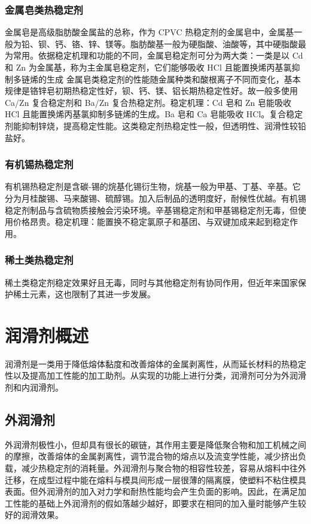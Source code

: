 \subsubsection{金属皂类热稳定剂}
金属皂是高级脂肪酸金属盐的总称，作为 CPVC 热稳定剂的金属皂中，金属基一般为铅、钡、钙、铬、锌、镁等。脂肪酸基一般为硬脂酸、油酸等，其中硬脂酸最为常用。依据稳定机理和功能的不同，金属皂稳定剂可分为两大类：一类是以 Cd 和 Zn 为金属基，称为主金属皂稳定剂，它们能够吸收 HCl 且能置换烯丙基氯抑制多链烯的生成
金属皂类稳定剂的性能随金属种类和酸根离子不同而变化，基本规律是铬锌皂初期热稳定性好，钡、钙、镁、铝长期热稳定性好。故一般多使用 Ca/Zn 复合稳定剂和 Ba/Zn 复合热稳定剂。稳定机理：Cd 皂和 Zn 皂能吸收 HCl 且能置换烯丙基氯抑制多链烯的生成。Ba 皂和 Ca 皂能吸收 HCl。复合稳定剂能抑制锌烧，提高稳定性能。这类稳定剂热稳定性一般，但透明性、润滑性较铅盐好。

\subsubsection{有机锡热稳定剂}
有机锡热稳定剂是含碳-锡的烷基化锡衍生物，烷基一般为甲基、丁基、辛基。它分为月桂酸锡、马来酸锡、硫醇锡。加入后制品的透明度好，耐候性优越。有机锡稳定剂制品与含硫物质接触会污染环境。辛基锡稳定剂和甲基锡稳定剂无毒，但使用价格昂贵。稳定机理：能置换不稳定氯原子和基团、与双键加成来起到稳定作用。

\subsubsection{稀土类热稳定剂}
稀土类稳定剂稳定效果好且无毒，同时与其他稳定剂有协同作用，但近年来国家保护稀土元素，这也限制了其进一步发展。


\section{润滑剂概述\cite{2}}
润滑剂是一类用于降低熔体黏度和改善熔体的金属剥离性，从而延长材料的热稳定性以及提高加工性能的加工助剂。从实现的功能上进行分类，润滑剂可分为外润滑剂和内润滑剂。

\subsection{外润滑剂}
外润滑剂极性小，但却具有很长的碳链，其作用主要是降低聚合物和加工机械之间的摩擦，改善熔体的金属剥离性，调节混合物的熔点以及流变学性能，减少挤出负载，减少热稳定剂的消耗量。外润滑剂与聚合物的相容性较差，容易从熔料中往外迁移，在成型过程中能在熔料与模具间形成一层很薄的隔离膜，使塑料不粘住模具表面。但外润滑剂的加入对力学和耐热性能均会产生负面的影响。因此，在满足加工性能的基础上外润滑剂的假如落越少越好，即要求在相同的加入量时能够产生较好的润滑效果。

